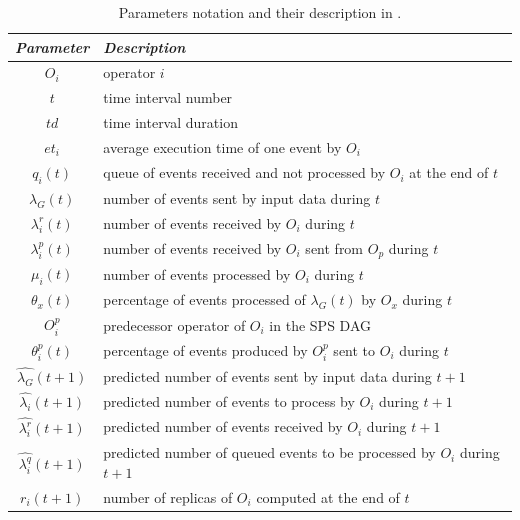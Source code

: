 \begin{table}[!ht]
\begin{tabular}{|c|l|}
    \hline
    \textit{\textbf{Parameter}}     & \textit{\textbf{Description}}             \\  \hline
    $O_i$                           & operator $i$ \\
    $t$                             & time interval number \\ 
    $td$                            & time interval duration  \\
    $et_i$                          & average execution time of one event by $O_i$  \\
    $q_i(t)$                        & queue of events received and not processed by $O_i$ at the end of $t$ \\
    $\lambda_G(t)$                  & number of events sent by input data during $t$ \\
    $\lambda^r_i(t)$                & number of events received by $O_i$ during $t$\\
    $\lambda^p_i(t)$                & number of events received by $O_i$ sent from $O_p$ during $t$\\
    $\mu_i(t)$                      & number of events processed by $O_i$ during $t$\\
    $\theta_x(t)$                   & percentage of events processed of $\lambda_G(t)$ by $O_x$ during $t$\\
    $O_i^p$                         & predecessor operator of $O_i$ in the SPS DAG \\
    $\theta_i^p(t)$                 & percentage of events produced by $O_i^p$ sent to $O_i$ during $t$\\
    $\widehat{\lambda_G}(t+1)$      & predicted number of events sent by input data during $t+1$ \\
    $\widehat{\lambda_i}(t+1)$      & predicted number of events to process by $O_i$ during $t+1$ \\
    $\widehat{\lambda_i^r}(t+1)$    & predicted number of events received by $O_i$ during $t+1$ \\
    $\widehat{\lambda_i^q}(t+1)$    & predicted number of queued events to  be processed by $O_i$ during $t+1$ \\
    $r_i(t+1)$                      & number of replicas of $O_i$ computed at the end of $t$  \\
    \hline
\end{tabular}
\caption{Parameters notation and their description in \pSPS{}.}
\label{tab:notations}
\end{table}

